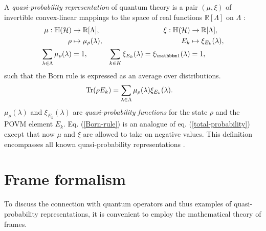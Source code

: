 A \emph{quasi-probability representation} of quantum theory is a pair $(\mu,\xi)$ of invertible convex-linear mappings to the space of real functions $\mathbb{R}[\Lambda]$ on $\Lambda$ \cite{ferrie_framed_2009}:
\begin{align}\label{def-quasi-rep}
	\mu:\herm &\to \mathbb{R}[\Lambda], & \xi:\herm &\to \mathbb{R}[\Lambda], \\
	\rho &\mapsto \mu_{\rho} (\lambda), & E_k &\mapsto \xi_{E_k} (\lambda), \nonumber \\
	\sum_{\lambda \in \Lambda} \mu_{\rho}(\lambda) &= 1, &
	\sum_{k\in K} \xi_{E_k} (\lambda) = \xi_{\id} (\lambda) &= 1 \nonumber,
\end{align}
such that the Born rule is expressed as an average over distributions.
\begin{align}\label{Born-rule}
	\Tr (\rho E_k) &= \sum_{\lambda \in \Lambda} \mu_{\rho } (\lambda) \xi_{E_k} (\lambda).
\end{align}
$\mu_{\rho}(\lambda)$ and $\xi_{E_k}(\lambda)$ are \emph{quasi-probability functions} for the state $\rho$ and the POVM element $E_k$. Eq. (\ref{Born-rule}) is an analogue of eq. (\ref{total-probability}) except that now $\mu$ and $\xi$ are allowed to take on negative values. This definition encompasses all known quasi-probability representations \cite{ferrie_quasi-probability_2011}. %

\section{Frame formalism}

To discuss the connection with quantum operators and thus examples of quasi-probability representations, it is convenient to employ the mathematical theory of frames.

